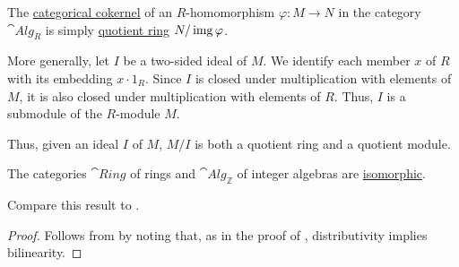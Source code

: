\begin{definition}
\begin{thmenum}
     The \hyperref[def:zero_morphisms/cokernel]{categorical cokernel} of an \( R \)-homomorphism \( \varphi: M \to N \) in the category \( \cat{Alg}_R \) is simply \hyperref[def:ring/quotient]{quotient ring} \( N / \operatorname{img} \varphi \).

    More generally, let \( I \) be a two-sided ideal of \( M \). We identify each member \( x \) of \( R \) with its embedding \( x \cdot 1_R \). Since \( I \) is closed under multiplication with elements of \( M \), it is also closed under multiplication with elements of \( R \). Thus, \( I \) is a submodule of the \( R \)-module \( M \).

    Thus, given an ideal \( I \) of \( M \), \( M / I \) is both a quotient ring and a quotient module.
  \end{thmenum}
\end{definition}

\begin{proposition}\label{thm:ring_is_integer_algebra}
  The categories \( \hyperref[def:ring/category]{\cat{Ring}} \) of rings and \( \hyperref[def:algebra_over_ring/category]{\cat{Alg}_\BbbZ} \) of integer algebras are \hyperref[rem:category_similarity/isomorphism]{isomorphic}.

  Compare this result to .
\end{proposition}
\begin{proof}
  Follows from  by noting that, as in the proof of , distributivity implies bilinearity.
\end{proof}

